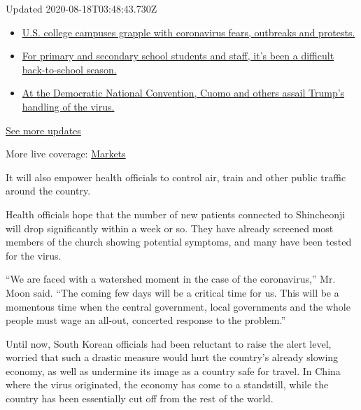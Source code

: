 Updated 2020-08-18T03:48:43.730Z

\begin{itemize}
\tightlist
\item
  \href{https://www.nytimes3xbfgragh.onion/2020/08/17/world/coronavirus-covid.html?action=click\&pgtype=Article\&state=default\&region=MAIN_CONTENT_1\&context=storylines_live_updates\#link-6fdbc8ef}{U.S.
  college campuses grapple with coronavirus fears, outbreaks and
  protests.}
\item
  \href{https://www.nytimes3xbfgragh.onion/2020/08/17/world/coronavirus-covid.html?action=click\&pgtype=Article\&state=default\&region=MAIN_CONTENT_1\&context=storylines_live_updates\#link-7e47207}{For
  primary and secondary school students and staff, it's been a difficult
  back-to-school season.}
\item
  \href{https://www.nytimes3xbfgragh.onion/2020/08/17/world/coronavirus-covid.html?action=click\&pgtype=Article\&state=default\&region=MAIN_CONTENT_1\&context=storylines_live_updates\#link-44c3fee2}{At
  the Democratic National Convention, Cuomo and others assail Trump's
  handling of the virus.}
\end{itemize}

\href{https://www.nytimes3xbfgragh.onion/2020/08/17/world/coronavirus-covid.html?action=click\&pgtype=Article\&state=default\&region=MAIN_CONTENT_1\&context=storylines_live_updates}{See
more updates}

More live coverage:
\href{https://www.nytimes3xbfgragh.onion/live/2020/08/17/business/stock-market-today-coronavirus?action=click\&pgtype=Article\&state=default\&region=MAIN_CONTENT_1\&context=storylines_live_updates}{Markets}

It will also empower health officials to control air, train and other
public traffic around the country.

Health officials hope that the number of new patients connected to
Shincheonji will drop significantly within a week or so. They have
already screened most members of the church showing potential symptoms,
and many have been tested for the virus.

``We are faced with a watershed moment in the case of the coronavirus,''
Mr. Moon said. ``The coming few days will be a critical time for us.
This will be a momentous time when the central government, local
governments and the whole people must wage an all-out, concerted
response to the problem.''

Until now, South Korean officials had been reluctant to raise the alert
level, worried that such a drastic measure would hurt the country's
already slowing economy, as well as undermine its image as a country
safe for travel. In China where the virus originated, the economy has
come to a standstill, while the country has been essentially cut off
from the rest of the world.


